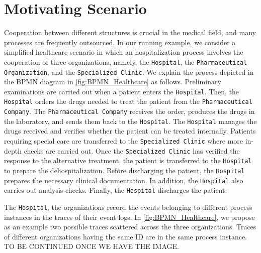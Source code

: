 \section{Motivating Scenario}\label{sec:motivating}
Cooperation between different structures is crucial in the medical field, and many processes are frequently outsourced. In our running example, we consider a simplified healthcare scenario in which an hospitalization process involves the cooperation of three organizations, namely, the \texttt{Hospital}, the \texttt{Pharmaceutical Organization}, and the \texttt{Specialized Clinic}. We explain the process depicted in the BPMN diagram in \cref{fig:BPMN_Healthcare} as follows.
Preliminary examinations are carried out when a patient enters the \texttt{Hospital}. Then, the \texttt{Hospital} orders the drugs needed to treat the patient from the \texttt{Pharmaceutical Company}. The \texttt{Pharmaceutical Company} receives the order, produces the drugs in the laboratory, and sends them back to the \texttt{Hospital}. The \texttt{Hospital} manages the drugs received and verifies whether the patient can be treated internally. Patients requiring special care are transferred to the \texttt{Specialized Clinic} where more in-depth checks are carried out. Once the \texttt{Specialized Clinic} has verified the response to the alternative treatment, the patient is transferred to the \texttt{Hospital} to prepare the dehospitalization. Before discharging the patient, the \texttt{Hospital} prepares the necessary clinical documentation. In addition, the \texttt{Hospital} also carries out analysis checks. Finally, the \texttt{Hospital} discharges the patient.

The \texttt{Hospital}, the  organizations record the events belonging to different process instances in the traces of their event logs. In \cref{fig:BPMN_Healthcare}, we propose as an example two possible traces scattered across the three organizations. Traces of different organizations having the same ID are in the same process instance. TO BE CONTINUED ONCE WE HAVE THE IMAGE.


